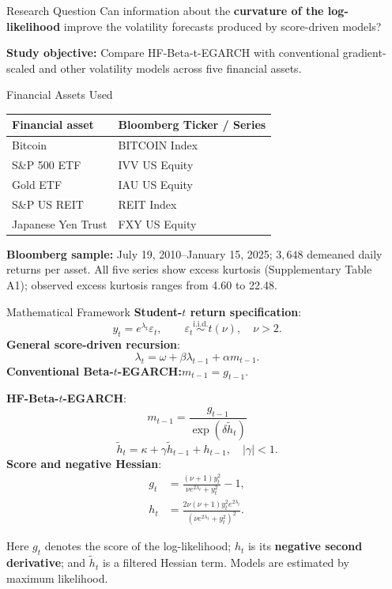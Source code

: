 \documentclass[final]{beamer}
\providecommand{\thinspaceafter}{%
    \par\vspace{0.15cm}%
}
\providecommand{\minor}[1]{%
    {\fontsize{27}{34}\selectfont #1\par}%
}
\newlength{\sepwidth}
\newlength{\colwidth}
\newcommand{\separatorcolumn}{
    \begin{column}{\sepwidth}
    \end{column}
}
\begin{document}
\begin{frame}[t]
\begin{columns}[t]
\separatorcolumn

\begin{column}{\colwidth}

    \begin{alertblock}{Research Question}
        Can information about the \textbf{curvature of the log-likelihood} improve the volatility forecasts produced by score-driven models?

        \thinspaceafter
        \textbf{Study objective:} Compare HF-Beta-t-EGARCH with conventional gradient-scaled and other volatility models across five financial assets.
    \end{alertblock}

\begin{block}{Financial Assets Used}
{\fontsize{29}{36}\selectfont
\begin{tabular*}{\linewidth}{@{\extracolsep{\fill}}ll@{}}
\toprule
\textbf{Financial asset} & \textbf{Bloomberg Ticker / Series}\\
\midrule
Bitcoin & BITCOIN Index\\
S\&P 500 ETF & IVV US Equity\\
Gold ETF & IAU US Equity\\
S\&P US REIT & REIT Index\\
Japanese Yen Trust & FXY US Equity\\
\bottomrule
\end{tabular*}\par}
\vspace{0.2cm}
\minor{\textbf{Bloomberg sample:} July 19, 2010--January 15, 2025; $3{,}648$ demeaned daily returns per asset. All five series show excess kurtosis (Supplementary Table A1); observed excess kurtosis ranges from 4.60 to 22.48.}
\end{block}

\begin{block}{Mathematical Framework}
\textbf{Student-$t$ return specification}:
\[
 y_t=e^{\lambda_t}\varepsilon_t,\qquad
 \varepsilon_t\overset{\mathrm{i.i.d.}}{\sim}t(\nu),\quad \nu>2.
\]
\textbf{General score-driven recursion}:
\[
 \lambda_t=\omega+\beta\lambda_{t-1}+\alpha m_{t-1}.
\]
\textbf{Conventional Beta-$t$-EGARCH:}\quad $m_{t-1}=g_{t-1}$.

\thinspaceafter
\textbf{HF-Beta-$t$-EGARCH}:
\[
 \boxed{\displaystyle m_{t-1}=\frac{g_{t-1}}{\exp(\delta\widetilde{h}_t)}}
\]
\[
 \widetilde{h}_t=\kappa+\gamma\widetilde{h}_{t-1}+h_{t-1},\quad |\gamma|<1.
\]
\textbf{Score and negative Hessian}:
\[
 \begin{aligned}
  g_t &= \frac{(\nu+1)y_t^2}{\nu e^{2\lambda_t}+y_t^2}-1,\\[0.2cm]
  h_t &= \frac{2\nu(\nu+1)y_t^2e^{2\lambda_t}}{(\nu e^{2\lambda_t}+y_t^2)^2}.
 \end{aligned}
\]
\minor{Here $g_t$ denotes the score of the log-likelihood; $h_t$ is its \textbf{negative second derivative}; and $\widetilde{h}_t$ is a filtered Hessian term. Models are estimated by maximum likelihood.}
\end{block}


\end{column}
\end{columns}
\end{frame}
\end{document}
